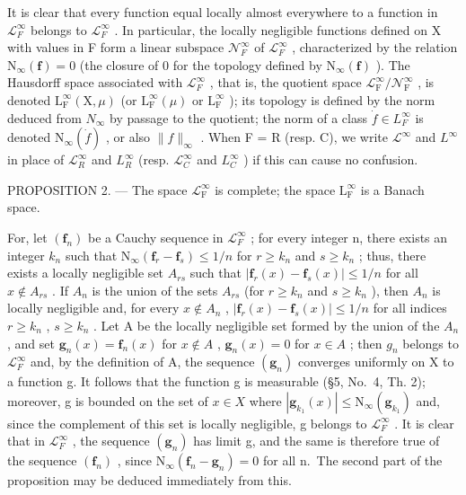 It is clear that every function equal locally almost everywhere to a function in \(\mathcal{L}_{F}^{\infty}\) belongs to \(\mathcal{L}_{F}^{\infty}\) . In particular, the locally negligible functions defined on X with values in F form a linear subspace \(\mathcal{N}_{F}^{\infty}\) of \(\mathcal{L}_{F}^{\infty}\) , characterized by the relation \(\mathrm{N}_{\infty}(\mathbf{f}) = 0\) (the closure of 0 for the topology defined by \(\mathrm{N}_{\infty}(\mathbf{f})\) ). The Hausdorff space associated with \(\mathcal{L}_{F}^{\infty}\) , that is, the quotient space \(\mathcal{L}_{\mathrm{F}}^{\infty}/\mathcal{N}_{\mathrm{F}}^{\infty}\) , is denoted \(\mathrm{L}_{\mathrm{F}}^{\infty}(\mathrm{X}, \mu)\) (or \(\mathrm{L}_{\mathrm{F}}^{\infty}(\mu)\) or \(\mathrm{L}_{\mathrm{F}}^{\infty}\) ); its topology is defined by the norm deduced from \(N_{\infty}\) by passage to the quotient; the norm of a class \(\dot{f} \in L_{F}^{\infty}\) is denoted \(\mathrm{N}_{\infty}(\dot{f})\) , or also \(\|f\|_{\infty}\) . When F = R (resp. C), we write \(\mathcal{L}^{\infty}\) and \(L^{\infty}\) in place of \(\mathcal{L}_{R}^{\infty}\) and \(L_{R}^{\infty}\) (resp. \(\mathcal{L}_{C}^{\infty}\) and \(L_{C}^{\infty}\) ) if this can cause no confusion.

PROPOSITION 2. --- The space \(\mathcal{L}_{\mathrm{F}}^{\infty}\) is complete; the space \(\mathrm{L}_{\mathrm{F}}^{\infty}\) is a Banach space.

For, let \((\mathbf{f}_{n})\) be a Cauchy sequence in \(\mathcal{L}_{F}^{\infty}\) ; for every integer n, there exists an integer \(k_{n}\) such that \(\mathrm{N}_{\infty}(\mathbf{f}_{r}-\mathbf{f}_{s})\leqslant1/n\) for \(r\geqslant k_{n}\) and \(s\geqslant k_{n}\) ; thus, there exists a locally negligible set \(A_{rs}\) such that \(|\mathbf{f}_{r}(x)-\mathbf{f}_{s}(x)|\leqslant1/n\) for all \(x\notin A_{rs}\) . If \(A_{n}\) is the union of the sets \(A_{rs}\) (for \(r\geqslant k_{n}\) and \(s\geqslant k_{n}\) ), then \(A_{n}\) is locally negligible and, for every \(x\notin A_{n}\) , \(|\mathbf{f}_{r}(x)-\mathbf{f}_{s}(x)|\leqslant1/n\) for all indices \(r\geqslant k_{n}\) , \(s\geqslant k_{n}\) . Let A be the locally negligible set formed by the union of the \(A_{n}\) , and set \(\mathbf{g}_{n}(x)=\mathbf{f}_{n}(x)\) for \(x\notin A\) , \(\mathbf{g}_{n}(x)=0\) for \(x\in A\) ; then \(g_{n}\) belongs to \(\mathcal{L}_{F}^{\infty}\) and, by the definition of A, the sequence \((\mathbf{g}_{n})\) converges uniformly on X to a function g. It follows that the function g is measurable (§5, No.~4, Th. 2); moreover, g is bounded on the set of \(x\in X\) where \(|\mathbf{g}_{k_{1}}(x)|\leqslant\mathrm{N}_{\infty}(\mathbf{g}_{k_{1}})\) and, since the complement of this set is locally negligible, g belongs to \(\mathcal{L}_{F}^{\infty}\) . It is clear that in \(\mathcal{L}_{F}^{\infty}\) , the sequence \((\mathbf{g}_{n})\) has limit g, and the same is therefore true of the sequence \((\mathbf{f}_{n})\) , since \(\mathrm{N}_{\infty}(\mathbf{f}_{n}-\mathbf{g}_{n})=0\) for all n.~The second part of the proposition may be deduced immediately from this.

